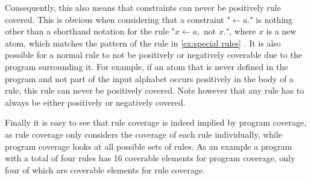Consequently, this also means that constraints can never be positively rule covered. This is obvious when considering that a constraint "\(\leftarrow a.\)" is nothing other than a shorthand notation for the rule "\(x \leftarrow a, \text{ not } x.\)", where $x$ is a new atom, which matches the pattern of the rule in \cref{ex:special rules} \cite[p. 17]{Geb+12}. It is also possible for a normal rule to not be positively or negatively coverable due to the program surrounding it. For example, if an atom that is never defined in the program and not part of the input alphabet occurs positively in the body of a rule, this rule can never be positively covered. Note however that any rule has to always be either positively or negatively covered.

Finally it is easy to see that rule coverage is indeed implied by program coverage, as rule coverage only considers the coverage of each rule individually, while program coverage looks at all possible sets of rules. As an example a program with a total of four rules has 16 coverable elements for program coverage, only four of which are coverable elements for rule coverage.

\begin{comment}
    - Definition + example      \/
    
    - (similar to program coverage in some ways but less complex!)
    
    - some rules may sometimes (or always) not be coverable -> examples -> ties back to beginning of the chapter / thats why coverage 
    is defined on coverable objects     \/
    
    (- total program coverage implies total rule coverage -> not so relevant but maybe interesting to mention?)      \/
\end{comment}


\begin{comment}
    - constraints are a special type of rule and have to be handled slightly differently because when the body of a constraint is true 
    (=normal rule coverage) this will imply false and therefore not create an answer set / create an unsatisfiable solve call -> we 
    cant check constraints the same way we check other rules
    
    - solution: (following the suggestion in the paper by \textcite{Jan+11}) remove the constraint from the program in order to check 
    for its covereage!
    
    - Definition + examples
    
    (- maybe reminder that these coverage metrics dont really care about what the output of the program is and whether its according to 
    the specification, therefore removing constraints is okay even though it might completely destroy the functionality of the program)
\end{comment}

